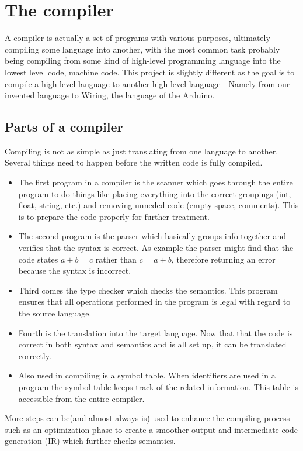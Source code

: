 \section{The compiler}
A compiler is actually a set of programs with various purposes, ultimately compiling some language into another, with the most common task probably being compiling from some kind of high-level programming language into the lowest level code, machine code. This project is slightly different as the goal is to compile a high-level language to another high-level language - Namely from our invented language to Wiring, the language of the Arduino.
\subsection{Parts of a compiler}
Compiling is not as simple as just translating from one language to another. Several things need to happen before the written code is fully compiled.\\

\begin{itemize}
\item The first program in a compiler is the scanner which goes through the entire program to do things like placing everything into the correct groupings (int, float, string, etc.) and removing unneded code (empty space, comments). This is to prepare the code properly for further treatment.
\item The second program is the parser which basically groups info together and verifies that the syntax is correct. As example the parser might find that the code states $a + b = c$ rather than $c = a + b$, therefore returning an error because the syntax is incorrect.\\

\item Third comes the type checker which checks the semantics. This program ensures that all operations performed in the program is legal with regard to the source language.

\item Fourth is the translation into the target language. Now that that the code is correct in both syntax and semantics and is all set up, it can be translated correctly.

\item Also used in compiling is a symbol table. When identifiers are used in a program the symbol table keeps track of the related information. This table is accessible from the entire compiler.
\end{itemize}

More steps can be(and almost always is) used to enhance the compiling process such as an optimization phase to create a smoother output and intermediate code generation (IR) which further checks semantics.